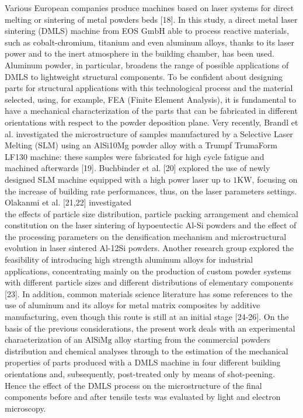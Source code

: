 \documentclass[10pt]{article}
\begin{document}
Various European companies produce machines based on laser systems for direct melting or sintering of metal powders beds [18]. In this study, a direct metal laser sintering (DMLS) machine from EOS $\mathrm{GmbH}$ able to process reactive materials, such as cobalt-chromium, titanium and even aluminum alloys, thanks to its laser power and to the inert atmosphere in the building chamber, has been used. Aluminum powder, in particular, broadens the range of possible applications of DMLS to lightweight structural components. To be confident about designing parts for structural applications with this technological process and the material selected, using, for example, FEA (Finite Element Analysis), it is fundamental to have a mechanical characterization of the parts that can be fabricated in different orientations with respect to the powder deposition plane. Very recently, Brandl et al. investigated the microstructure of samples manufactured by a Selective Laser Melting (SLM) using an AlSi10Mg powder alloy with a Trumpf TrumaForm LF130 machine: these samples were fabricated for high cycle fatigue and machined afterwards [19]. Buchbinder et al. [20] explored the use of newly designed SLM machine equipped with a high power laser up to $1 \mathrm{KW}$, focusing on the increase of building rate performances, thus, on the laser parameters settings. Olakanmi et al. [21,22] investigated\\
the effects of particle size distribution, particle packing arrangement and chemical constitution on the laser sintering of hypoeutectic Al-Si powders and the effect of the processing parameters on the densification mechanism and microstructural evolution in laser sintered Al-12Si powders. Another research group explored the feasibility of introducing high strength aluminum alloys for industrial applications, concentrating mainly on the production of custom powder systems with different particle sizes and different distributions of elementary components [23]. In addition, common materials science literature has some references to the use of aluminum and its alloys for metal matrix composites by additive manufacturing, even though this route is still at an initial stage [24-26]. On the basis of the previous considerations, the present work deals with an experimental characterization of an $\mathrm{AlSiMg}$ alloy starting from the commercial powders distribution and chemical analyses through to the estimation of the mechanical properties of parts produced with a DMLS machine in four different building orientations and, subsequently, post-treated only by means of shot-peening. Hence the effect of the DMLS process on the microstructure of the final components before and after tensile tests was evaluated by light and electron microscopy.
\end{document}
